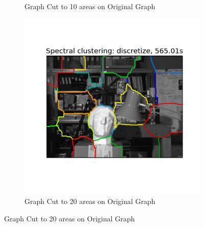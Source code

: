 \begin{figure}[h!]
\begin{subfigure}[h]{0.33\textwidth}
                \caption{Graph Cut to 10 areas on Original Graph}
                \label{fig:graphcut_10}
        \end{subfigure}
        \begin{subfigure}[h]{0.33\textwidth}
                \includegraphics[width=\textwidth]{fig/592_large_20.png}
                \caption{Graph Cut to 20 areas on Original Graph}
                \label{fig:graphcut_20}
        \end{subfigure}
        

\end{figure}
